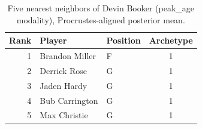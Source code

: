 \begin{table}[htbp]
  \centering\small
  \begin{tabular}{rllc}
    \toprule
    Rank & Player & Position & Archetype \\
    \midrule
    1 & Brandon Miller & F & 1 \\
    2 & Derrick Rose & G & 1 \\
    3 & Jaden Hardy & G & 1 \\
    4 & Bub Carrington & G & 1 \\
    5 & Max Christie & G & 1 \\
    \bottomrule
  \end{tabular}
  \caption{Five nearest neighbors of Devin Booker (peak_age modality), Procrustes-aligned posterior mean.}
  \label{tab:Devin_Booker_neighbors_peak_age}
\end{table}

